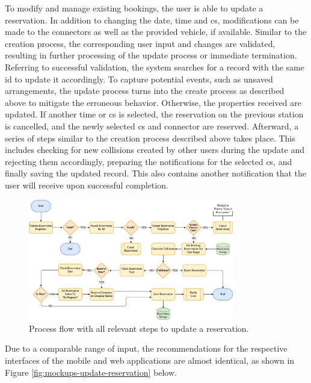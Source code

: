 To modify and manage existing bookings, the user is able to update a reservation. In addition to changing the date, time and \acrshort{cs}, modifications can be made to the connectors as well as the provided vehicle, if available.
Similar to the creation process, the corresponding user input and changes are validated, resulting in further processing of the update process or immediate termination.
Referring to successful validation, the system searches for a record with the same \acrshort{id} to update it accordingly.
To capture potential events, such as unsaved arrangements, the update process turns into the create process as described above to mitigate the erroneous behavior.
Otherwise, the properties received are updated. If another time or \acrshort{cs} is selected, the reservation on the previous station is cancelled, and the newly selected \acrshort{cs} and connector are reserved.
Afterward, a series of steps similar to the creation process described above takes place. This includes checking for new collisions created by other users during the update and rejecting them accordingly, preparing the notifications for the selected \acrshort{cs}, and finally saving the updated record.
This also contains another notification that the user will receive upon successful completion.

\begin{figure}[h]
    \centering
    \includegraphics[width=0.8\textwidth,keepaspectratio]{resources/images/main/5_design/processes/ReservationUpdate.png}
    \caption{Process flow with all relevant steps to update a reservation.}
    \label{fig:update-reservation-flowchart}
\end{figure}

\noindent Due to a comparable range of input, the recommendations for the respective interfaces of the mobile and web applications are almost identical, as shown in Figure \ref{fig:mockups-update-reservation} below.

